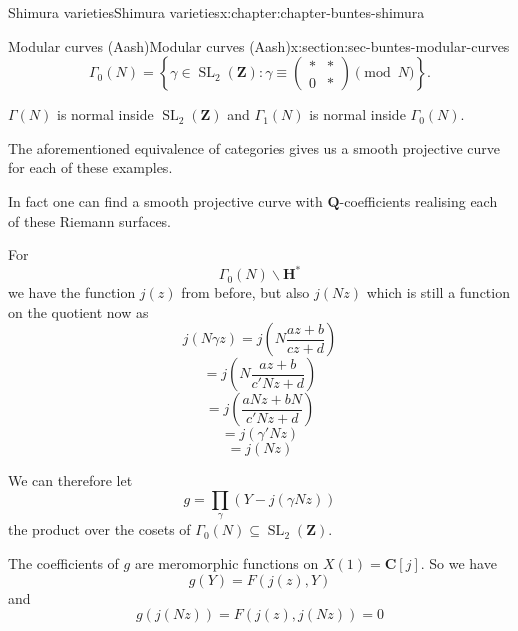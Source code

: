 \documentclass[oneside,10pt,]{book}
\numberwithin{equation}{section}
\newcommand{\lb}{[}
\newcommand{\rb}{]}
\newcommand{\ZZ}{\mathbf{Z}}
\newcommand{\QQ}{\mathbf{Q}}
\newcommand{\CC}{\mathbf{C}}
\newcommand{\HH}{\mathbf{H}}
\DeclareMathOperator{\SL}{SL}
\newcommand{\amp}{&}
\begin{document}
\begin{chapterptx}{Shimura varieties}{}{Shimura varieties}{}{}{x:chapter:chapter-buntes-shimura}
\begin{sectionptx}{Modular curves (Aash)}{}{Modular curves (Aash)}{}{}{x:section:sec-buntes-modular-curves}
\begin{equation*}
\end{equation*}
%
\begin{equation*}
\Gamma_0(N) = \left\{ \gamma \in \SL_2(\ZZ) : \gamma \equiv \begin{pmatrix} \ast\amp\ast \\ 0 \amp \ast \end{pmatrix} \pmod N \right\}\text{.}
\end{equation*}
%
\par
\(\Gamma(N)\) is normal inside \(\SL_2(\ZZ)\) and \(\Gamma_1(N)\) is normal inside \(\Gamma_0(N)\).%
\par
The aforementioned equivalence of categories gives us a smooth projective curve for each of these examples.%
\par
In fact one can find a smooth projective curve with \(\QQ\)-coefficients realising each of these Riemann surfaces.%
\par
For%
\begin{equation*}
\Gamma_0(N) \backslash \HH^*
\end{equation*}
we have the function \(j(z)\) from before, but also \(j(Nz)\) which is still a function on the quotient now as%
\begin{equation*}
j(N \gamma z) = j\left( N\frac{az + b}{cz+d} \right)
\end{equation*}
%
\begin{equation*}
= j\left( N\frac{az + b}{c'Nz+d} \right)
\end{equation*}
%
\begin{equation*}
= j\left( \frac{aNz + bN}{c'Nz+d} \right)
\end{equation*}
%
\begin{equation*}
= j\left( \gamma ' Nz\right)
\end{equation*}
%
\begin{equation*}
= j\left( Nz\right)
\end{equation*}
%
\par
We can therefore let%
\begin{equation*}
g = \prod_{\gamma} (Y - j(\gamma Nz))
\end{equation*}
the product over the cosets of \(\Gamma_0(N) \subseteq \SL_2(\ZZ)\).%
\par
The coefficients of \(g\) are meromorphic functions on \(X(1) = \CC\lb j \rb\). So we have%
\begin{equation*}
g(Y) = F(j(z), Y)
\end{equation*}
and%
\begin{equation*}
g (j(Nz)) = F(j(z), j(Nz)) = 0

\end{equation*}
\end{sectionptx}
\end{chapterptx}
\end{document}
